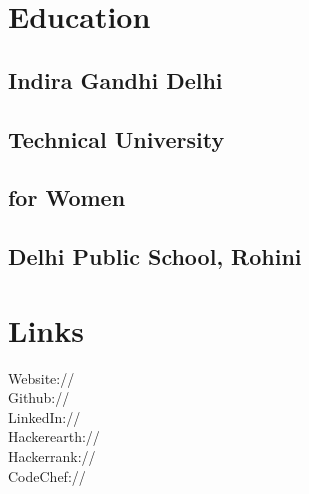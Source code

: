 \documentclass[]{deedy-resume-openfont}
\begin{document}
\begin{minipage}[t]{0.33\textwidth} 


\section{Education} 

\subsection{Indira Gandhi Delhi}\subsection{Technical University}\subsection{ for Women}
\sectionsep


\subsection{Delhi Public School, Rohini}
\sectionsep


\section{Links}
Website:// \href{https://tanvi-surana.github.io}{} \\
Github:// \href{https://github.com/tanvi-surana}{} \\
LinkedIn://  \href{https://www.linkedin.com/in/tanvisurana}{} \\
Hackerearth://  \href{https://www.hackerearth.com/tanvi.surana}{} \\
Hackerrank://  \href{https://www.hackerrank.com/tanvisurana20}{} \\
CodeChef://  \href{https://www.codechef.com/users/skull2012}{} \\
\sectionsep


\end{minipage}
\end{document}
